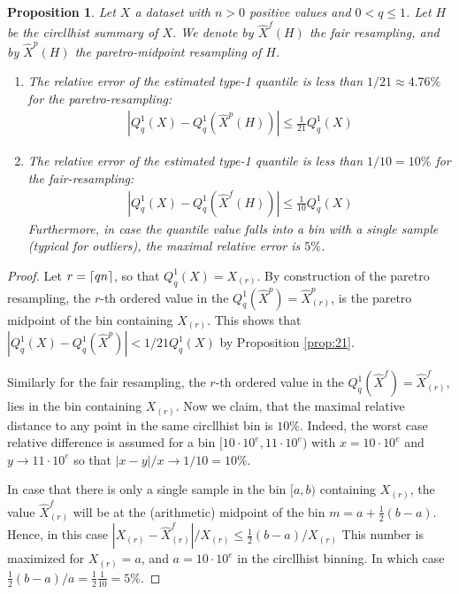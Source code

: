 \documentclass{article}
\DeclarePairedDelimiter{\ceil}{\lceil}{\rceil}
\theoremstyle{plain}
\newtheorem{proposition}[definition]{Proposition}
\theoremstyle{remark}
\newcommand{\ra}{\rightarrow}
\begin{document}
\begin{proposition}
  Let $X$ a dataset with $n > 0$ positive values and $0 < q \leq 1$. Let $H$ be the circllhist summary of $X$.
  We denote by $\hat{X}^f(H)$ the fair resampling, and by $\hat{X}^p(H)$ the paretro-midpoint resampling of $H$.
  \begin{enumerate}
  \item The relative error of the estimated type-1 quantile is less than $1/21 \approx 4.76\%$ for
    the paretro-resampling:
    \begin{align*}
      |Q^1_q(X) - Q^1_q(\hat{X}^p(H))| \leq \frac{1}{21} Q^1_q(X)
    \end{align*}
  \item The relative error of the estimated type-1 quantile is less than $1/10 = 10\%$ for
    the fair-resampling:
    \begin{align*}
      |Q^1_q(X) - Q^1_q(\hat{X}^f(H))| \leq \frac{1}{10} Q^1_q(X)
    \end{align*}
    Furthermore, in case the quantile value falls into a bin with a single sample (typical for
    outliers), the maximal relative error is $5\%$.
  \end{enumerate}
\end{proposition}

\begin{proof}
  Let $r = \ceil{q n}$, so that $Q^1_q(X) = X_{(r)}$.
  By construction of the paretro resampling, the $r$-th ordered value in the $Q^1_q(\hat{X}^p) = \hat{X}^p_{(r)}$,
  is the paretro midpoint of the bin containing $X_{(r)}$.
  This shows that $|Q^1_q(X) - Q^1_q(\hat{X}^p)| < 1/21 Q^1_q(X)$ by Proposition \ref{prop:21}.

  Similarly for the fair resampling, the $r$-th ordered value in the $Q^1_q(\hat{X}^f) = \hat{X}^f_{(r)}$,
  lies in the bin containing $X_{(r)}$.
  Now we claim, that the maximal relative distance to any point in the same circllhist bin is $10\%$.
  Indeed, the worst case relative difference is assumed for a bin $[10 \cdot 10^e, 11 \cdot 10^e)$ with
  $x = 10 \cdot 10^e$ and $y \ra 11 \cdot 10^e$ so that $|x-y|/x \ra 1/10 = 10\%$.

  In case that there is only a single sample in the bin $[a,b)$ containing $X_{(r)}$, the value
  $\hat{X}^f_{(r)}$ will be at the (arithmetic) midpoint of the bin $m = a+\frac{1}{2}(b-a)$.
  Hence, in this case $|X_{(r)} - \hat{X}^f_{(r)}| / X_{(r)} \leq \frac{1}{2} (b-a)/X_{(r)}$
  This number is maximized for $X_{(r)} = a$, and $a = 10 \cdot 10^e$ in the circllhist binning.
  In which case $\frac{1}{2} (b-a)/a =\frac{1}{2} \frac{1}{10} = 5\%$.
\end{proof}
\end{document}
